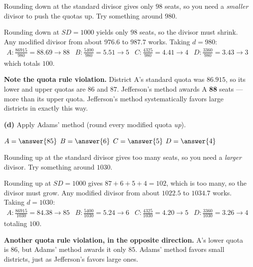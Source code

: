 \documentclass[12pt]{ximera}
\begin{document}
\begin{problem}
\begin{prompt}
\begin{hint}
Rounding down at the standard divisor gives only $98$ seats, so you need a
\emph{smaller} divisor to push the quotas up. Try something around $980$.
\end{hint}

\begin{feedback}
Rounding down at $SD = 1000$ yields only $98$ seats, so the divisor must shrink.
Any modified divisor from about $976.6$ to $987.7$ works. Taking $d = 980$:
\[
\begin{array}{llll}
A: \frac{86915}{980}=88.69 \to 88 &
B: \frac{5400}{980}=5.51 \to 5 &
C: \frac{4325}{980}=4.41 \to 4 &
D: \frac{3360}{980}=3.43 \to 3
\end{array}
\]
which totals $100$. \checkmark

\textbf{Note the quota rule violation.} District A's standard quota was $86.915$, so
its lower and upper quotas are $86$ and $87$. Jefferson's method awards A \textbf{88}
seats --- more than its upper quota. Jefferson's method systematically favors large
districts in exactly this way.
\end{feedback}
\end{prompt}

\begin{prompt}
\textbf{(d)} Apply Adams' method (round every modified quota \emph{up}).

$A = \answer{85}$ \quad $B = \answer{6}$ \quad $C = \answer{5}$ \quad $D = \answer{4}$

\begin{hint}
Rounding up at the standard divisor gives too many seats, so you need a \emph{larger}
divisor. Try something around $1030$.
\end{hint}

\begin{feedback}
Rounding up at $SD=1000$ gives $87+6+5+4 = 102$, which is too many, so the divisor must
grow. Any modified divisor from about $1022.5$ to $1034.7$ works. Taking $d = 1030$:
\[
\begin{array}{llll}
A: \frac{86915}{1030}=84.38 \to 85 &
B: \frac{5400}{1030}=5.24 \to 6 &
C: \frac{4325}{1030}=4.20 \to 5 &
D: \frac{3360}{1030}=3.26 \to 4
\end{array}
\]
totaling $100$. \checkmark

\textbf{Another quota rule violation, in the opposite direction.} A's lower quota is
$86$, but Adams' method awards it only $85$. Adams' method favors small districts, just
as Jefferson's favors large ones.
\end{feedback}
\end{prompt}


\end{problem}
\end{document}
